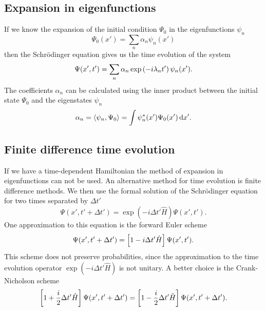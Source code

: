 \subsection*{Expansion in eigenfunctions}
If we know the expansion of the initial condition $\Psi_0$ in the eigenfunctions $\psi_n$
\begin{equation}
    \Psi_0(x') = \sum_n \alpha_n \psi_n(x')
\end{equation}
then the Schrödinger equation gives us the time evolution of the system
\begin{equation}
    \Psi(x', t') = \sum_n \alpha_n \exp\del{-i\lambda_n t'}\psi_n(x').
    \label{eq:time_evolution_expansion}
\end{equation}
The coefficients $\alpha_n$ can be calculated using the inner product between the initial state $\Psi_0$ and the eigenstates $\psi_n$
\begin{equation}
    \alpha_n = \langle \psi_n, \Psi_0 \rangle = \int \psi_n^{*}(x')\Psi_0(x') \mathop{}\!\mathrm{d} x'.
    \label{eq:coeffs}
\end{equation}

\subsection*{Finite difference time evolution}
If we have a time-dependent Hamiltonian 
the method of expansion in eigenfunctions can not be used. An alternative method for time evolution is finite difference methods. We then use the formal solution of the Schrödinger equation for two times separated by $\Delta t'$
\begin{equation}
    \Psi(x', t' + \Delta t') = \exp(-i\Delta t' \hat H)\Psi(x', t').
\end{equation}
One approximation to this equation is the forward Euler scheme
\begin{equation}
    \Psi(x', t'+\Delta t') = \sbr{1 - i\Delta t' \hat H} \Psi(x', t').
    \label{eq:euler_scheme}
\end{equation}
This scheme does not preserve probabilities, since the approximation to the time evolution operator $\exp(-i\Delta t' \hat H)$ is not unitary. A better choice is the Crank-Nicholson scheme
\begin{equation}
    \sbr{1 + \frac{i}{2}\Delta t' \hat H} \Psi(x', t'+\Delta t') = \sbr{1 - \frac{i}{2}\Delta t' \hat H} \Psi(x', t'+\Delta t').
    \label{eq:cn_scheme}
\end{equation}


